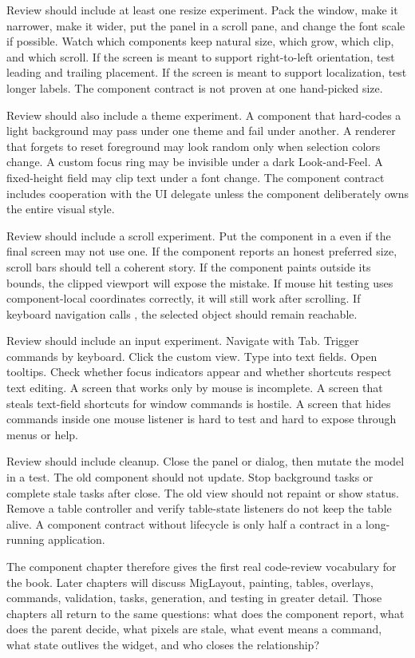 Review should include at least one resize experiment. Pack the window, make it narrower, make it wider, put the panel in a scroll pane, and change the font scale if possible. Watch which components keep natural size, which grow, which clip, and which scroll. If the screen is meant to support right-to-left orientation, test leading and trailing placement. If the screen is meant to support localization, test longer labels. The component contract is not proven at one hand-picked size.

Review should also include a theme experiment. A component that hard-codes a light background may pass under one theme and fail under another. A renderer that forgets to reset foreground may look random only when selection colors change. A custom focus ring may be invisible under a dark Look-and-Feel. A fixed-height field may clip text under a font change. The component contract includes cooperation with the UI delegate unless the component deliberately owns the entire visual style.

Review should include a scroll experiment. Put the component in a  even if the final screen may not use one. If the component reports an honest preferred size, scroll bars should tell a coherent story. If the component paints outside its bounds, the clipped viewport will expose the mistake. If mouse hit testing uses component-local coordinates correctly, it will still work after scrolling. If keyboard navigation calls , the selected object should remain reachable.

Review should include an input experiment. Navigate with Tab. Trigger commands by keyboard. Click the custom view. Type into text fields. Open tooltips. Check whether focus indicators appear and whether shortcuts respect text editing. A screen that works only by mouse is incomplete. A screen that steals text-field shortcuts for window commands is hostile. A screen that hides commands inside one mouse listener is hard to test and hard to expose through menus or help.

Review should include cleanup. Close the panel or dialog, then mutate the model in a test. The old component should not update. Stop background tasks or complete stale tasks after close. The old view should not repaint or show status. Remove a table controller and verify table-state listeners do not keep the table alive. A component contract without lifecycle is only half a contract in a long-running application.

The component chapter therefore gives the first real code-review vocabulary for the book. Later chapters will discuss MigLayout, painting, tables, overlays, commands, validation, tasks, generation, and testing in greater detail. Those chapters all return to the same questions: what does the component report, what does the parent decide, what pixels are stale, what event means a command, what state outlives the widget, and who closes the relationship?

